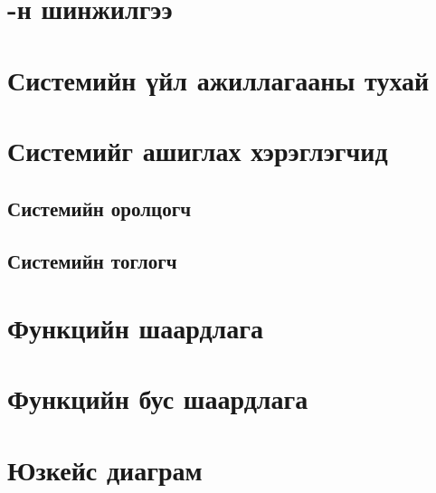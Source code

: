 
\section{\ttitle-н шинжилгээ} %

\label{Chapter3} %

\section{Системийн үйл ажиллагааны тухай}

\section{Системийг ашиглах хэрэглэгчид}
  \subsection{Системийн оролцогч}
  \subsection{Системийн тоглогч}
  
\section{Функцийн шаардлага}

\section{Функцийн бус шаардлага}

\section{Юзкейс диаграм}

